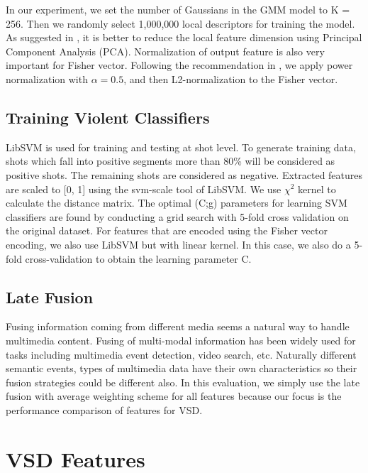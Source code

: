 \documentclass[twocolumn]{bmcart}%
\begin{document}
In our experiment, we set the number of Gaussians in the GMM model to K = 256. Then we randomly select 1,000,000 local descriptors for training the model. As suggested in \cite{perronnin2010improving}, it is better to reduce the local feature dimension using Principal Component Analysis (PCA). Normalization of output feature is also very important for Fisher vector. Following the recommendation in \cite{perronnin2010improving}, we apply power normalization with $\alpha=0.5$, and then L2-normalization to the Fisher vector.

\subsection{Training Violent Classifiers}

LibSVM \cite{LibSVM} is used for training and testing at shot level. To generate training data, shots which fall into positive segments more than 80\% will be considered as positive shots. The remaining shots are considered as negative. Extracted features are scaled to [0, 1] using the svm-scale tool of LibSVM. We use $\chi^2$ kernel to calculate the distance matrix. The optimal (C;g) parameters for learning SVM classifiers are found by conducting a grid search with 5-fold cross validation on the original dataset. For features that are encoded using the Fisher vector encoding, we also use LibSVM but with linear kernel. In this case, we also do a 5-fold cross-validation to obtain the learning parameter C.

\subsection{Late Fusion}
Fusing information coming from different media seems a natural way to handle multimedia content. Fusing of multi-modal information has been widely used for tasks including multimedia event detection, video search, etc. Naturally different semantic events, types of multimedia data have their own characteristics so their fusion strategies could be different also. In this evaluation, we simply use the late fusion with average weighting scheme for all features \cite{snoek2005early} because our focus is the performance comparison of features for VSD.

\section{VSD Features}
\label{vsd_feature}
\end{document}
